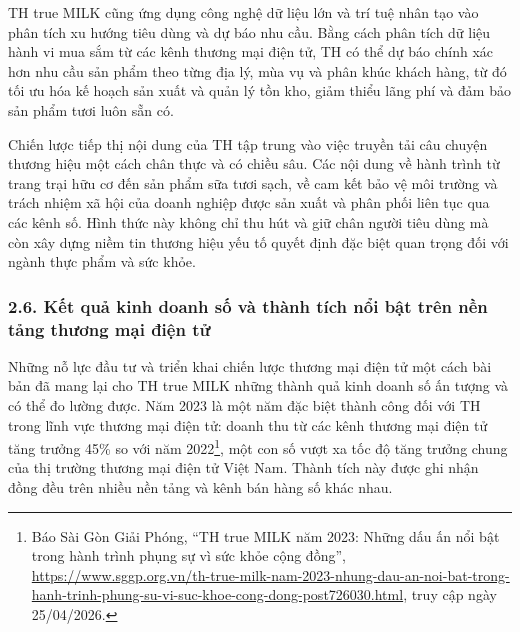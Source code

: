 TH true MILK cũng ứng dụng công nghệ dữ liệu lớn và trí tuệ nhân tạo vào
phân tích xu hướng tiêu dùng và dự báo nhu cầu. Bằng cách phân tích dữ
liệu hành vi mua sắm từ các kênh thương mại điện tử, TH có thể dự báo
chính xác hơn nhu cầu sản phẩm theo từng địa lý, mùa vụ và phân khúc
khách hàng, từ đó tối ưu hóa kế hoạch sản xuất và quản lý tồn kho, giảm
thiểu lãng phí và đảm bảo sản phẩm tươi luôn sẵn có.

Chiến lược tiếp thị nội dung của TH tập trung vào việc truyền tải câu
chuyện thương hiệu một cách chân thực và có chiều sâu. Các nội dung về
hành trình từ trang trại hữu cơ đến sản phẩm sữa tươi sạch, về cam kết
bảo vệ môi trường và trách nhiệm xã hội của doanh nghiệp được sản xuất
và phân phối liên tục qua các kênh số. Hình thức này không chỉ thu hút
và giữ chân người tiêu dùng mà còn xây dựng niềm tin thương hiệu yếu tố
quyết định đặc biệt quan trọng đối với ngành thực phẩm và sức khỏe.

\subsubsection{2.6. Kết quả kinh doanh số và thành tích nổi bật trên nền
tảng thương mại điện
tử}\label{kux1ebft-quux1ea3-kinh-doanh-sux1ed1-vuxe0-thuxe0nh-tuxedch-nux1ed5i-bux1eadt-truxean-nux1ec1n-tux1ea3ng-thux1b0ux1a1ng-mux1ea1i-ux111iux1ec7n-tux1eed}

Những nỗ lực đầu tư và triển khai chiến lược thương mại điện tử một cách
bài bản đã mang lại cho TH true MILK những thành quả kinh doanh số ấn
tượng và có thể đo lường được. Năm 2023 là một năm đặc biệt thành công
đối với TH trong lĩnh vực thương mại điện tử: doanh thu từ các kênh
thương mại điện tử tăng trưởng 45\% so với năm 2022\footnote{Báo Sài Gòn
  Giải Phóng, ``TH true MILK năm 2023: Những dấu ấn nổi bật trong hành
  trình phụng sự vì sức khỏe cộng đồng'',
  \url{https://www.sggp.org.vn/th-true-milk-nam-2023-nhung-dau-an-noi-bat-trong-hanh-trinh-phung-su-vi-suc-khoe-cong-dong-post726030.html},
  truy cập ngày 25/04/2026.}, một con số vượt xa tốc độ tăng trưởng
chung của thị trường thương mại điện tử Việt Nam. Thành tích này được
ghi nhận đồng đều trên nhiều nền tảng và kênh bán hàng số khác nhau.

